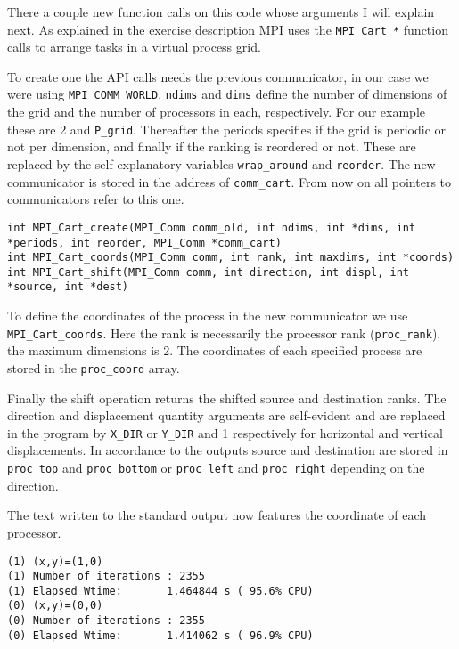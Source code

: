There a couple new function calls on this code whose arguments I will explain next.
As explained in the exercise description MPI uses the \texttt{MPI\_Cart\_*} function calls to arrange tasks in a virtual process grid.

To create one the API calls needs the previous communicator, in our case we were using \texttt{MPI\_COMM\_WORLD}. \texttt{ndims} and \texttt{dims} define the number of dimensions of the grid and the number of processors in each, respectively. For our example these are 2 and \texttt{P\_grid}. Thereafter the periods specifies if the grid is periodic or not per dimension, and finally if the ranking is reordered or not. These are replaced by the self-explanatory variables \texttt{wrap\_around} and \texttt{reorder}. The new communicator is stored in the address of \texttt{comm\_cart}. From now on all pointers to communicators refer to this one.

\begin{lstlisting}
int MPI_Cart_create(MPI_Comm comm_old, int ndims, int *dims, int *periods, int reorder, MPI_Comm *comm_cart)
int MPI_Cart_coords(MPI_Comm comm, int rank, int maxdims, int *coords)
int MPI_Cart_shift(MPI_Comm comm, int direction, int displ, int *source, int *dest)
\end{lstlisting}

To define the coordinates of the process in the new communicator we use \texttt{MPI\_Cart\_coords}. Here the rank is necessarily the processor rank (\texttt{proc\_rank}), the maximum dimensions is 2. The coordinates of each specified process are stored in the \texttt{proc\_coord} array.

Finally the shift operation returns the shifted source and destination ranks. The direction and displacement quantity arguments are self-evident and are replaced in the program by \texttt{X\_DIR} or \texttt{Y\_DIR} and 1 respectively for horizontal and vertical displacements. In accordance to the outputs source and destination are stored in \texttt{proc\_top} and \texttt{proc\_bottom} or \texttt{proc\_left} and \texttt{proc\_right} depending on the direction. 


The text written to the standard output now features the coordinate of each processor.

\begin{lstlisting}
(1) (x,y)=(1,0)
(1)	Number of iterations : 2355
(1) Elapsed Wtime:       1.464844 s ( 95.6% CPU)
(0) (x,y)=(0,0)
(0)	Number of iterations : 2355
(0) Elapsed Wtime:       1.414062 s ( 96.9% CPU)
\end{lstlisting}

